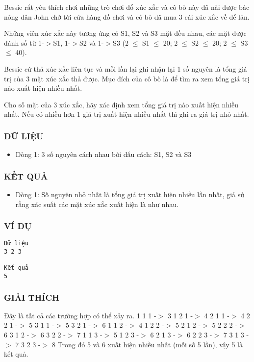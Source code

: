 



   Bessie rất yêu thích chơi những trò chơi đổ xúc xắc và cô bò này đã nài được bác nông dân John chở tới cửa hàng đồ chơi và cô bò đã mua 3 cái xúc xắc về để lăn.  

   Những viên xúc xắc này tương ứng có S1, S2 và S3 mặt đều nhau, các mặt được đánh  số từ 1-$>$S1, 1-$>$S2 và 1-$>$S3 (2  $\le$  S1  $\le$  20; 2  $\le$  S2  $\le$  20; 2  $\le$  S3  $\le$  40).  

   Bessie cứ thả xúc xắc liên tục và mỗi lần lại ghi nhận lại 1 số nguyên là tổng giá trị  của 3 mặt xúc xắc thả được. Mục đích của cô bò là để tìm ra xem tổng giá trị nào  xuất hiện nhiều nhất.  

   Cho số mặt của 3 xúc xắc, hãy xác định xem tổng giá trị nào xuất hiện nhiều nhất. Nếu có nhiều hơn 1 giá trị xuất hiện nhiều nhất thì ghi ra giá trị nhỏ nhất.  

\subsubsection{   DỮ LIỆU  }
\begin{itemize}
	\item     Dòng 1: 3 số nguyên cách nhau bởi dấu cách: S1, S2 và S3   
\end{itemize}

\subsubsection{   KẾT QUẢ  }
\begin{itemize}
	\item     Dòng 1: Số nguyên nhỏ nhất là tổng giá trị xuất hiện nhiều lần nhất, giả sử rằng         xác suất các mặt xúc xắc xuất hiện là như nhau.   
\end{itemize}

\subsubsection{   VÍ DỤ  }
\begin{verbatim}
Dữ liệu
3 2 3

Kết quả
5
\end{verbatim}

\subsubsection{   GIẢI THÍCH  }

   Đây là tất cả các trường hợp có thể xảy ra. 1 1 1 -$>$ 3  1 2 1 -$>$ 4  2 1 1 -$>$ 4  2 2 1 -$>$ 5  3 1 1 -$>$ 5  3 2 1 -$>$ 6 1 1 2 -$>$ 4  1 2 2 -$>$ 5  2 1 2 -$>$ 5  2 2 2 -$>$ 6  3 1 2 -$>$ 6  3 2 2 -$>$ 7 1 1 3 -$>$ 5  1 2 3 -$>$ 6  2 1 3 -$>$ 6  2 2 3 -$>$ 7  3 1 3 -$>$ 7  3 2 3 -$>$ 8 Trong đó 5 và 6 xuất hiện nhiều nhất (mỗi số 5 lần), vậy 5 là kết quả.  
